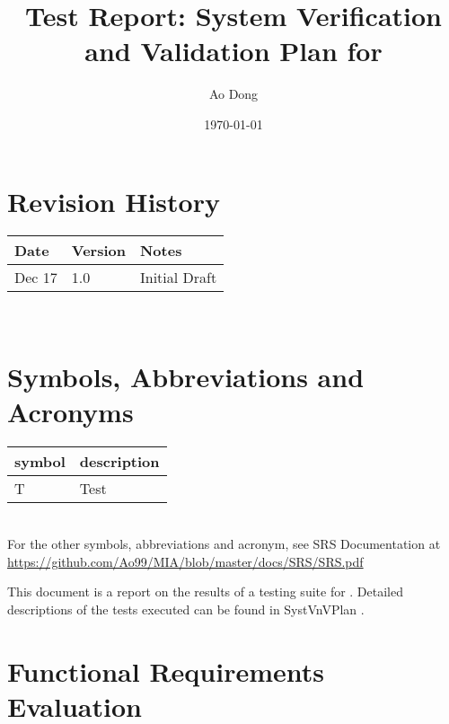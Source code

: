 \documentclass[12pt, titlepage]{article}
\begin{document}
\title{Test Report: System Verification and Validation Plan for \progname{}} 
\author{Ao Dong}
\date{\today}
	
\maketitle


\section{Revision History}

\begin{tabularx}{\textwidth}{p{3cm}p{2cm}X}
\toprule {\bf Date} & {\bf Version} & {\bf Notes}\\
\midrule
Dec 17 & 1.0 & Initial Draft\\
\bottomrule
\end{tabularx}

~\newpage

\section{Symbols, Abbreviations and Acronyms}

\renewcommand{\arraystretch}{1.2}
\begin{tabular}{l l} 
  \toprule		
  \textbf{symbol} & \textbf{description}\\
  \midrule 
  T & Test\\
  \bottomrule
\end{tabular}\\

For the other symbols, abbreviations and acronym, see SRS Documentation at
\url{https://github.com/Ao99/MIA/blob/master/docs/SRS/SRS.pdf}

\newpage

\tableofcontents

\listoftables %

\listoffigures %

\newpage


This document is a report on the results of a testing suite for \progname{}.
Detailed descriptions of the tests executed can be found in SystVnVPlan
\cite{Dong2019SystVnV}.

\section{Functional Requirements Evaluation}
\end{document}
